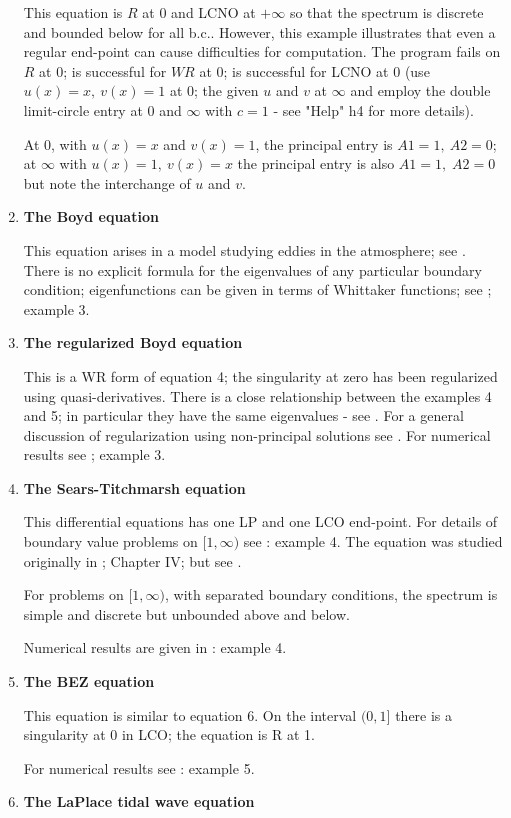 \begin{enumerate}
This equation is $R$ at $0$ and LCNO at $+ \infty$ so that the spectrum
is discrete and bounded below for all b.c..  However, this example
illustrates that even a regular end-point can cause difficulties for computation.
The program fails on $R$ at $0$; is successful for $WR$ at $0$; is
successful for LCNO at $0$ (use $u(x) = x, \ v(x) = 1$ at $0$; the given
$u$ and $v$ at $\infty $ and employ the double limit-circle entry at $0$
and $\infty $ with $c=1$ - see "Help" h4 for more details).

At $0$, with $u(x) = x$ and $v(x) =1$, the principal entry is $A1 = 1,
\ A2 = 0$; at $\infty $ with $u(x) = 1, \ v(x) = x$ the principal entry
is also $A1=1, \; A2=0$ but note the interchange of $u$ and $v$.
\item %
{\bf The Boyd equation}

This equation arises in a model studying eddies in the atmosphere;
see \cite{B}.  There is no explicit formula for the eigenvalues of any
particular boundary condition; eigenfunctions can be given in terms of
Whittaker functions; see \cite{BEZ}; example 3.
\item%
{\bf The regularized Boyd equation}

This is a WR form of equation 4; the singularity at  zero has been
regularized using quasi-derivatives.  There is a close relationship
between the examples 4 and 5; in particular they have the same eigenvalues 
- see \cite{AEZ}.  For a general discussion of
regularization using non-principal solutions see \cite{NZ}.  For numerical
results see \cite{BEZ}; example 3.
\item %
{\bf The Sears-Titchmarsh equation}

This differential equations has one LP and one LCO end-point.  For
details of boundary value problems on $[1, \infty )$ see \cite{BEZ}: example
4.  The equation was studied originally in \cite{T}; Chapter IV; but see
\cite{ST}.

For problems on $[1, \infty)$, with separated boundary conditions, the
spectrum is simple and discrete but unbounded above and below.

Numerical results are given in \cite{BEZ}: example 4.
\item %
{\bf The BEZ equation}

This equation is similar to equation 6.  On the interval $(0, 1]$ there
is a singularity at $0$ in LCO; the equation is R at 1.

For numerical results see \cite{BEZ}: example 5.
\item %
{\bf The LaPlace tidal wave equation}


\end{enumerate}
